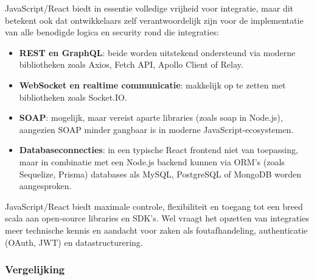 JavaScript/React biedt in essentie volledige vrijheid voor integratie, maar dit betekent ook dat ontwikkelaars zelf verantwoordelijk zijn voor de implementatie van alle benodigde logica en security rond die integraties:
\begin{itemize}
    \item \textbf{REST en GraphQL}: beide worden uitstekend ondersteund via moderne bibliotheken zoals Axios, Fetch API, Apollo Client of Relay.
    \item \textbf{WebSocket en realtime communicatie}: makkelijk op te zetten met bibliotheken zoals Socket.IO.
    \item \textbf{SOAP}: mogelijk, maar vereist aparte libraries (zoals soap in Node.js), aangezien SOAP minder gangbaar is in moderne JavaScript-ecosystemen.
    \item \textbf{Databaseconnecties}: in een typische React frontend niet van toepassing, maar in combinatie met een Node.js backend kunnen via ORM's (zoals Sequelize, Prisma) databases als MySQL, PostgreSQL of MongoDB worden aangesproken.
\end{itemize}

JavaScript/React biedt maximale controle, flexibiliteit en toegang tot een breed scala aan open-source libraries en SDK’s. Wel vraagt het opzetten van integraties meer technische kennis en aandacht voor zaken als foutafhandeling, authenticatie (OAuth, JWT) en datastructurering.

\subsubsection{Vergelijking}

